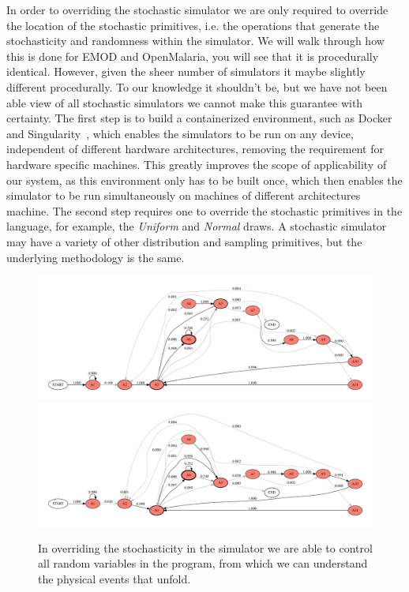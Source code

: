 \documentclass{article}
\begin{document}
In order to overriding the stochastic simulator we are only required to override the location of the stochastic primitives, i.e. the operations that generate the stochasticity and randomness within the simulator. 
We will walk through how this is done for EMOD and OpenMalaria, you will see that it is procedurally identical.
However, given the sheer number of simulators it maybe slightly different procedurally. 
To our knowledge it shouldn't be, but we have not been able view of all stochastic simulators we cannot make this guarantee with certainty. 
The first step is to build a containerized environment, such as Docker~\cite{merkel2014docker} and Singularity~\cite{kurtzer2017singularity}, which enables the simulators to be run on any device, independent of different hardware architectures, removing the requirement for hardware specific machines. 
This greatly improves the scope of applicability of our system, as this environment only has to be built once, which then enables the simulator to be run simultaneously on machines of different architectures machine. 
The second step requires one to override the stochastic primitives in the language, for example, the \emph{Uniform} and \emph{Normal} draws. 
A stochastic simulator may have a variety of other distribution and sampling primitives, but the underlying methodology is the same. 


\begin{figure}[h!]
\centering
   \includegraphics[width=\textwidth]{../plots/ewan_25_pop_10.pdf}
   \bigbreak 
   \includegraphics[width=\textwidth]{../plots/ewan_25_pop_100.pdf}

\caption{In overriding the stochasticity in the simulator we are able to control all random variables in the program,
	 from which we can understand the physical events that unfold. }
\end{figure}
\end{document}
